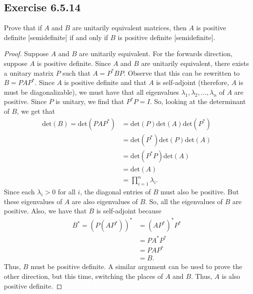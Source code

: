 \subsection*{Exercise 6.5.14} Prove that if \( A  \) and \( B  \) are unitarily equivalent matrices, then \( A  \) is positive definite [semidefinite] if and only if \( B  \) is positive definite [semidefinite].
\begin{proof}
Suppose \( A  \) and \( B  \) are unitarily equivalent. For the forwards direction, suppose \( A  \) is positive definite. Since \( A  \) and \( B  \) are unitarily equivalent, there exists a unitary matrix \( P  \) such that \( A = P^{*} B P  \). Observe that this can be rewritten to \( B = P A P^{*}  \). Since \( A  \) is positive definite and that \( A  \) is self-adjoint (therefore, \( A  \) is must be diagonalizable), we must have that all eigenvalues \( {\lambda}_{1}, {\lambda}_{2}, \dots, {\lambda}_{n}  \) of \( A  \) are positive. Since \( P  \) is unitary, we find that \( P^{*}P = I  \). So, looking at the determinant of \( B  \), we get that      
\begin{align*}
    \text{det}(B) = \text{det}(P A P^{*}) &= \text{det}(P) \text{det}(A) \text{det}(P^{*})  \\
                                          &= \text{det}(P^{*})\text{det}(P) \text{det}(A) \\
                                          &= \text{det}(P^{*}P) \text{det}(A) \\
                                          &= \text{det}(A) \\
                                          &= \prod_{i=1}^{n} {\lambda}_{i}.
\end{align*}
Since each \( {\lambda}_{i} > 0  \) for all \( i  \), the diagonal entries of \( B  \) must also be positive. But these eigenvalues of \( A  \) are also eigenvalues of \( B  \). So, all the eigenvalues of \( B  \) are positive. Also, we have that \( B  \) is self-adjoint because 
\begin{align*}
    B^{*} = (P (A P^{*}))^{*} &= (A P^{*})^{*} P^{*}  \\
                              &= P A^{*} P^{*} \\
                              &= P A P^{*} \\
                              &= B.
\end{align*}
Thus, \( B  \) must be positive definite. A similar argument can be used to prove the other direction, but this time, switching the places of \( A  \) and \( B  \). Thus, \( A  \) is also positive definite.
\end{proof}

